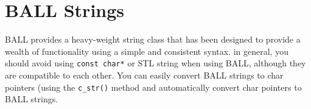 \section{BALL Strings}

BALL provides a heavy-weight string class that has been designed
to provide a wealth of functionality using a simple and consistent syntax.
in general, you should avoid using {\tt const char*} or STL string when using
BALL, although they are compatible to each other. You can easily convert BALL
strings to char pointers (using the {\tt c\_str()} method and automatically
convert char pointers to BALL strings.
